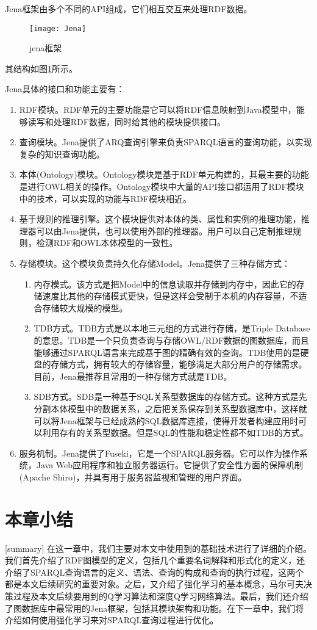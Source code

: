 Jena框架由多个不同的API组成，它们相互交互来处理RDF数据。
\begin{figure}[h]
    \centering
    \texttt{[image: Jena]}
    \caption{jena框架}
    \label{Jena}
\end{figure}
其结构如图\ref{Jena}所示。

Jena具体的接口和功能主要有：
\begin{enumerate}
    \item RDF模块。RDF单元的主要功能是它可以将RDF信息映射到Java模型中，能够读写和处理RDF数据，同时给其他的模块提供接口。
    \item 查询模块。Jena提供了ARQ查询引擎来负责SPARQL语言的查询功能，以实现复杂的知识查询功能。
    \item 本体(Ontology)模块。Ontology模块是基于RDF单元构建的，其最主要的功能是进行OWL相关的操作。Ontology模块中大量的API接口都运用了RDF模块中的技术，可以实现的功能与RDF模块相近。
    \item 基于规则的推理引擎。这个模块提供对本体的类、属性和实例的推理功能，推理器可以由Jena提供，也可以使用外部的推理器。用户可以自己定制推理规则，检测RDF和OWL本体模型的一致性。
    \item 存储模块。这个模块负责持久化存储Model。Jena提供了三种存储方式：
    \begin{enumerate}
        \item 内存模式。该方式是把Model中的信息读取并存储到内存中，因此它的存储速度比其他的存储模式更快，但是这样会受制于本机的内存容量，不适合存储较大规模的模型。
        \item TDB方式。TDB方式是以本地三元组的方式进行存储，是Triple Database的意思。TDB是一个只负责查询与存储OWL/RDF数据的图数据库，而且能够通过SPARQL语言来完成基于图的精确有效的查询。TDB使用的是硬盘的存储方式，拥有较大的存储容量，能够满足大部分用户的存储需求。目前，Jena最推荐且常用的一种存储方式就是TDB。
        \item SDB方式。SDB是一种基于SQL关系型数据库的存储方式。这种方式是先分割本体模型中的数据关系，之后把关系保存到关系型数据库中，这样就可以将Jena框架与已经成熟的SQL数据库连接，使得开发者构建应用时可以利用存有的关系型数据。但是SQL的性能和稳定性都不如TDB的方式。
    \end{enumerate}
    \item 服务机制。Jena提供了Fuseki，它是一个SPARQL服务器。它可以作为操作系统，Java Web应用程序和独立服务器运行。它提供了安全性方面的保障机制(Apache Shiro)，并具有用于服务器监视和管理的用户界面。
\end{enumerate}

\section{本章小结}[summary]
在这一章中，我们主要对本文中使用到的基础技术进行了详细的介绍。我们首先介绍了RDF图模型的定义，包括几个重要名词解释和形式化的定义，还介绍了SPARQL查询语言的定义、语法、查询的构成和查询的执行过程，这两个都是本文后续研究的重要对象。之后，又介绍了强化学习的基本概念，马尔可夫决策过程及本文后续要用到的Q学习算法和深度Q学习网络算法。最后，我们还介绍了图数据库中最常用的Jena框架，包括其模块架构和功能。在下一章中，我们将介绍如何使用强化学习来对SPARQL查询过程进行优化。

